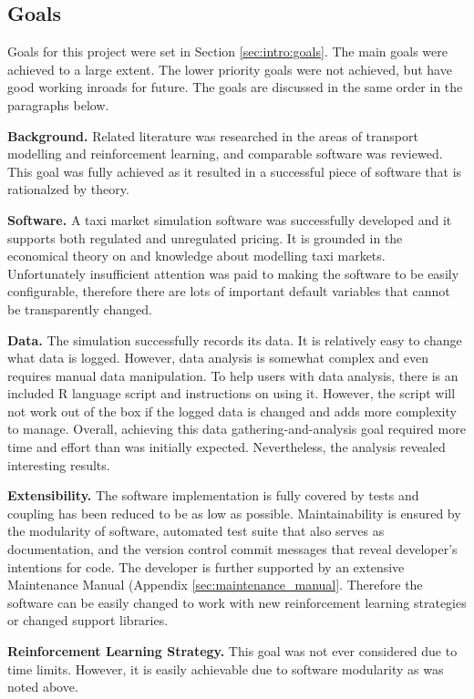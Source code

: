 \subsection{Goals}

Goals for this project were set in Section \ref{sec:intro:goals}. The main
goals were achieved to a large extent. The lower priority goals were not
achieved, but have good working inroads for future. The goals are discussed in
the same order in the paragraphs below.

\textbf{Background.} Related literature was researched in the areas of
transport modelling and reinforcement learning, and comparable software was
reviewed. This goal was fully achieved as it resulted in a successful piece of
software that is rationalzed by theory.

\textbf{Software.} A taxi market simulation software was successfully developed
and it supports both regulated and unregulated pricing. It is grounded in the
economical theory on  and knowledge about modelling taxi markets. Unfortunately
insufficient attention was paid to making the software to be easily
configurable, therefore there are lots of important default variables that
cannot be transparently changed.

\textbf{Data.} The simulation successfully records its data. It is
relatively easy to change what data is logged. However, data analysis is
somewhat complex and even requires manual data manipulation. To help users with
data analysis, there is an included R language script and instructions on using
it. However, the script will not work out of the box if the logged data is
changed and adds more complexity to manage. Overall, achieving this data
gathering-and-analysis goal required more time and effort than was initially
expected. Nevertheless, the analysis revealed interesting results.

\textbf{Extensibility.} The software implementation is fully covered by tests
and coupling has been reduced to be as low as possible. Maintainability is
ensured by the modularity of software, automated test suite that also serves as
documentation, and the version control commit messages that reveal developer's
intentions for code. The developer is further supported by an extensive
Maintenance Manual (Appendix \ref{sec:maintenance_manual}. Therefore the
software can be easily changed to work with new reinforcement learning
strategies or changed support libraries.

\textbf{Reinforcement Learning Strategy.} This goal was not ever considered due
to time limits. However, it is easily achievable due to software modularity as
was noted above.

